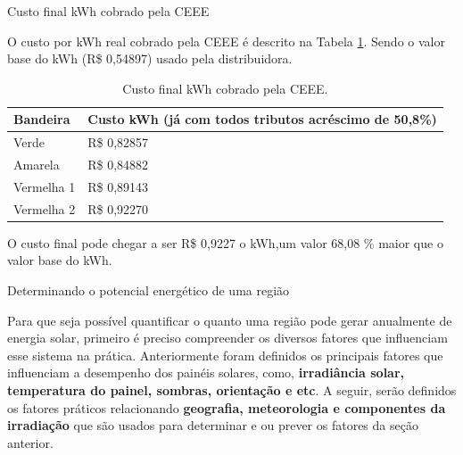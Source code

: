 \documentclass{beamer}
\begin{document}
\begin{frame}{Custo final kWh cobrado pela CEEE}

O custo por kWh real cobrado pela CEEE é descrito na Tabela \ref{kwh_ceee}. Sendo o valor base do kWh (R\$ 0,54897) usado pela distribuidora.

\begin{table}[htbp]
    \caption{Custo final kWh cobrado pela CEEE.}
        \begin{center}
            \begin{tabular}{ >{\centering\arraybackslash} m{3cm} >{\centering\arraybackslash} m{7cm}  }
                \hline
                Bandeira & Custo kWh \newline (já com todos tributos acréscimo de 50,8\%) \\ \hline
                Verde & R\$ 0,82857\\
                Amarela & R\$ 0,84882 \\
                Vermelha 1 & R\$ 0,89143\\
                Vermelha 2 & R\$ 0,92270 \\ \hline
            \end{tabular}
        \end{center}
    \label{kwh_ceee}
\end{table}

O custo final pode chegar a ser R\$ 0,9227 o kWh,\newline um valor 68,08 \% maior que o valor base do kWh.

\end{frame}


\begin{frame}{Determinando o potencial energético de uma região }

Para que seja possível quantificar o quanto uma região pode gerar anualmente de energia solar, primeiro é preciso compreender os diversos fatores que influenciam esse sistema na prática.
\newline
\newline
Anteriormente foram definidos os principais fatores que influenciam a desempenho dos painéis solares, como, \textbf{irradiância solar, temperatura do painel, sombras, orientação e etc}. A seguir, serão definidos os fatores práticos relacionando \textbf{geografia, meteorologia e componentes da irradiação} que são usados para determinar e ou prever os fatores da seção anterior.

\end{frame}
\end{document}
